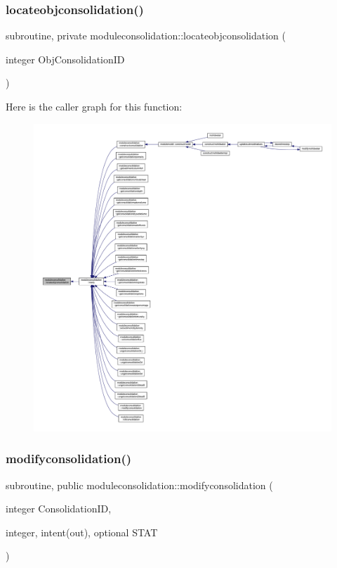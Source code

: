 \subsubsection{\texorpdfstring{locateobjconsolidation()}{locateobjconsolidation()}}
{\footnotesize\ttfamily subroutine, private moduleconsolidation\+::locateobjconsolidation (\begin{DoxyParamCaption}\item[{integer}]{Obj\+Consolidation\+ID }\end{DoxyParamCaption})\hspace{0.3cm}{\ttfamily [private]}}

Here is the caller graph for this function\+:\nopagebreak
\begin{figure}[H]
\begin{center}
\leavevmode
\includegraphics[width=350pt]{namespacemoduleconsolidation_a782ed1b2a1870dc38bceeca90e360669_icgraph}
\end{center}
\end{figure}
\mbox{\label{namespacemoduleconsolidation_a0143c8577e56dbbb86e0db4d5927c316}} 
\subsubsection{\texorpdfstring{modifyconsolidation()}{modifyconsolidation()}}
{\footnotesize\ttfamily subroutine, public moduleconsolidation\+::modifyconsolidation (\begin{DoxyParamCaption}\item[{integer}]{Consolidation\+ID,  }\item[{integer, intent(out), optional}]{S\+T\+AT }\end{DoxyParamCaption})}

